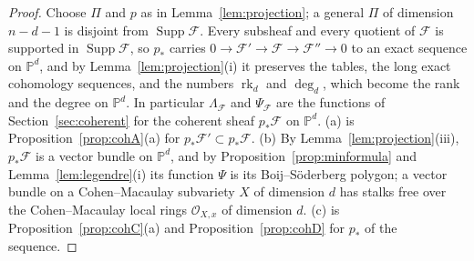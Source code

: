 \documentclass[11pt]{amsart}
\theoremstyle{definition}
\theoremstyle{remark}
\newcommand{\PP}{\mathbb{P}}
\newcommand{\OO}{\mathcal{O}}
\newcommand{\cF}{\mathcal{F}}
\DeclareMathOperator{\rk}{rk}
\begin{document}
\begin{proof}
Choose $\Pi$ and $p$ as in Lemma~\ref{lem:projection}; a general $\Pi$ of dimension $n-d-1$ is disjoint from $\operatorname{Supp}\cF$. Every subsheaf and every quotient of $\cF$ is supported in $\operatorname{Supp}\cF$, so $p_*$ carries $0\to\cF'\to\cF\to\cF''\to0$ to an exact sequence on $\PP^d$, and by Lemma~\ref{lem:projection}(i) it preserves the tables, the long exact cohomology sequences, and the numbers $\rk_d$ and $\deg_d$, which become the rank and the degree on $\PP^d$. In particular $\Lambda_\cF$ and $\Psi_\cF$ are the functions of Section~\ref{sec:coherent} for the coherent sheaf $p_*\cF$ on $\PP^d$. (a) is Proposition~\ref{prop:cohA}(a) for $p_*\cF'\subset p_*\cF$. (b) By Lemma~\ref{lem:projection}(iii), $p_*\cF$ is a vector bundle on $\PP^d$, and by Proposition~\ref{prop:minformula} and Lemma~\ref{lem:legendre}(i) its function $\Psi$ is its Boij--Söderberg polygon; a vector bundle on a Cohen--Macaulay subvariety $X$ of dimension $d$ has stalks free over the Cohen--Macaulay local rings $\OO_{X,x}$ of dimension $d$. (c) is Proposition~\ref{prop:cohC}(a) and Proposition~\ref{prop:cohD} for $p_*$ of the sequence.
\end{proof}
\end{document}

